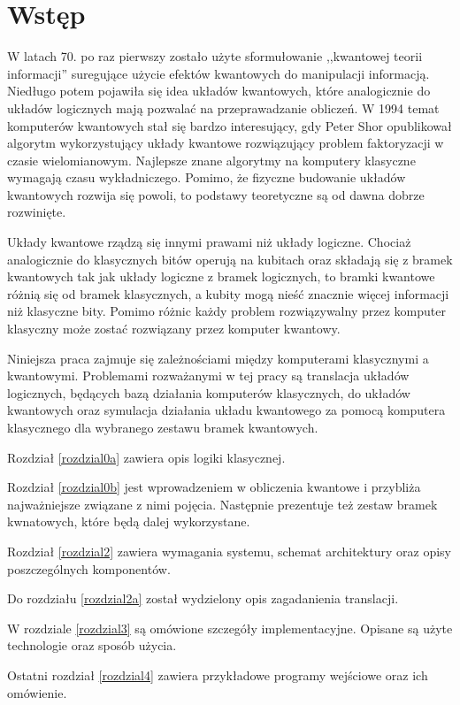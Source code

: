 \chapter{Wstęp}
\thispagestyle{chapterBeginStyle}

W latach 70. po raz pierwszy zostało użyte sformułowanie ,,kwantowej teorii informacji'' suregujące użycie efektów kwantowych do manipulacji informacją. Niedługo potem pojawiła się idea układów kwantowych, które analogicznie do układów logicznych mają pozwalać na przeprawadzanie obliczeń. W 1994 temat komputerów kwantowych stał się bardzo interesujący, gdy Peter Shor opublikował algorytm wykorzystujący układy kwantowe rozwiązujący problem faktoryzacji w czasie wielomianowym. Najlepsze znane algorytmy na komputery klasyczne wymagają czasu wykładniczego. Pomimo, że fizyczne budowanie układów kwantowych rozwija się powoli, to podstawy teoretyczne są od dawna dobrze rozwinięte.

Układy kwantowe rządzą się innymi prawami niż układy logiczne. Chociaż analogicznie do klasycznych bitów operują na kubitach oraz składają się z bramek kwantowych tak jak układy logiczne z bramek logicznych, to bramki kwantowe różnią się od bramek klasycznych, a kubity mogą nieść znacznie więcej informacji niż klasyczne bity. Pomimo różnic każdy problem rozwiązywalny przez komputer klasyczny może zostać rozwiązany przez komputer kwantowy.

Niniejsza praca zajmuje się zależnościami między komputerami klasycznymi a kwantowymi. Problemami rozważanymi w tej pracy są translacja układów logicznych, będących bazą działania komputerów klasycznych, do układów kwantowych oraz symulacja działania układu kwantowego za pomocą komputera klasycznego dla wybranego zestawu bramek kwantowych. 

Rozdział \ref{rozdzial0a} zawiera opis logiki klasycznej.

Rozdział \ref{rozdzial0b} jest wprowadzeniem w obliczenia kwantowe i przybliża najważniejsze związane z nimi pojęcia. Następnie prezentuje też zestaw bramek kwnatowych, które będą dalej wykorzystane.

Rozdział \ref{rozdzial2} zawiera wymagania systemu, schemat architektury oraz opisy poszczególnych komponentów.

Do rozdziału \ref{rozdzial2a} został wydzielony opis zagadanienia translacji.

W rozdziale \ref{rozdzial3} są omówione szczegóły implementacyjne. Opisane są użyte technologie oraz sposób użycia.

Ostatni rozdział \ref{rozdzial4} zawiera przykładowe programy wejściowe oraz ich omówienie.